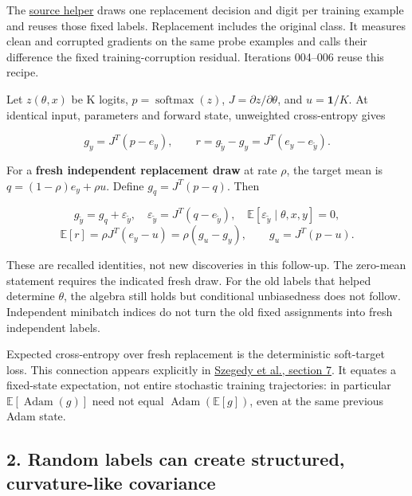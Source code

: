 \documentclass[
  british,
  10pt,
  a4paper,
]{article}
\begin{document}
The \href{../continuation/iteration-003/neural_harness.py}{source
helper} draws one replacement decision and digit per training example
and reuses those fixed labels. Replacement includes the original class.
It measures clean and corrupted gradients on the same probe examples and
calls their difference the fixed training-\allowbreak{}corruption
residual. Iterations 004--006 reuse this recipe.

Let \(z(\theta,x)\) be K logits, \(p=\operatorname{softmax}(z)\),
\(J=\partial z/\partial\theta\), and \(u=\mathbf1/K\). At identical
input, parameters and forward state, unweighted
cross-\allowbreak{}entropy gives

\[
g_y=J^T(p-e_y),\qquad r=g_{\tilde y}-g_y=J^T(e_y-e_{\tilde y}).
\]

For a \textbf{fresh independent replacement draw} at rate \(\rho\), the
target mean is \(q=(1-\rho)e_y+\rho u\). Define \(g_q=J^T(p-q)\). Then

\[
g_{\tilde y}=g_q+\varepsilon_{\tilde y},
\quad \varepsilon_{\tilde y}=J^T(q-e_{\tilde y}),\quad
\mathbb E[\varepsilon_{\tilde y}\mid \theta,x,y]=0,
\] \[
\mathbb E[r]=\rho J^T(e_y-u)
=\rho(g_u-g_y),\qquad g_u=J^T(p-u).
\]

These are recalled identities,\allowbreak{} not new discoveries in this
follow-up. The zero-mean statement requires the indicated fresh draw.
For the old labels that helped determine \(\theta\), the algebra still
holds but conditional unbiasedness does not follow. Independent
minibatch indices do not turn the old fixed assignments into fresh
independent labels.

Expected cross-\allowbreak{}entropy over fresh replacement is the
deterministic soft-\allowbreak{}target loss. This connection appears
explicitly in \href{https://arxiv.org/pdf/1512.00567}{Szegedy et al.,
section 7}. It equates a fixed-\allowbreak{}state
expectation,\allowbreak{} not entire stochastic training trajectories:
in particular \(\mathbb E[\operatorname{Adam}(g)]\) need not equal
\(\operatorname{Adam}(\mathbb E[g])\), even at the same previous Adam
state.

\subsection{\texorpdfstring{2. Random labels can create
structured,\allowbreak{} curvature-\allowbreak{}like
covariance}{2. Random labels can create   covariance}}\label{label-noise--random-labels-can-create-structured-curvature-like-covariance}
\end{document}
